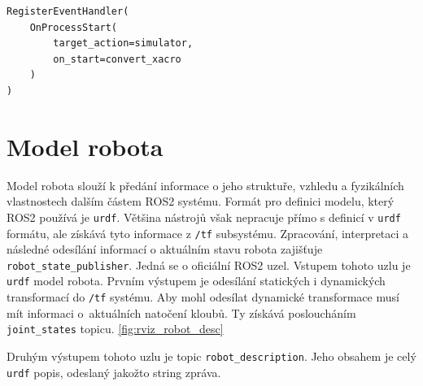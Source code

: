 \begin{verbatim}
RegisterEventHandler(
    OnProcessStart(
        target_action=simulator,
        on_start=convert_xacro
    )
)
\end{verbatim}

\section{Model robota} \label{implementation:model}
Model robota slouží k předání informace o jeho struktuře, vzhledu a fyzikálních vlastnostech dalším částem ROS2 systému. Formát pro definici modelu, který ROS2 používá je \verb|urdf|. Většina nástrojů však nepracuje přímo s definicí v \verb|urdf| formátu, ale získává tyto informace z \verb|/tf| subsystému. Zpracování, interpretaci a následné odesílání informací o aktuálním stavu robota zajišťuje \verb|robot_state_publisher|. Jedná se o oficiální ROS2 uzel. Vstupem tohoto uzlu je \verb|urdf| model robota. Prvním výstupem je odesílání statických i dynamických transformací do \verb|/tf| systému. Aby mohl odesílat dynamické transformace musí mít informaci o~aktuálních natočení kloubů. Ty získává posloucháním \verb|joint_states| topicu. \ref{fig:rviz_robot_desc}

Druhým výstupem tohoto uzlu je topic \verb|robot_description|. Jeho obsahem je celý \verb|urdf| popis, odeslaný jakožto string zpráva.

